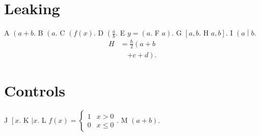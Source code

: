 \documentclass{article}
\begin{document}
\section*{Leaking}
A $\left( a+b\right.$.
B $\left( a\right.$.
C $\left( f(x)\right.$.
D $\left( \frac{a}{b}\right.$.
E $y=\left( a\right.$.
F $\left. a \right)$.
G $\left[ a,b \right.$.
H $\left. a,b \right]$.
I $\left( a \middle| b \right.$.
\begin{align}
  H & = \frac{\hbar}{2} \left( a + b \right. \nonumber \\
    & \quad \left. + c + d \right).
\end{align}
\section*{Controls}
J $\left[ x \right.$.
K $\left| x\right.$.
L $f(x)=\left\{ \begin{array}{ll} 1 & x>0\\ 0 & x\le 0\end{array}\right.$.
M $\left( a+b \right)$.
\end{document}

